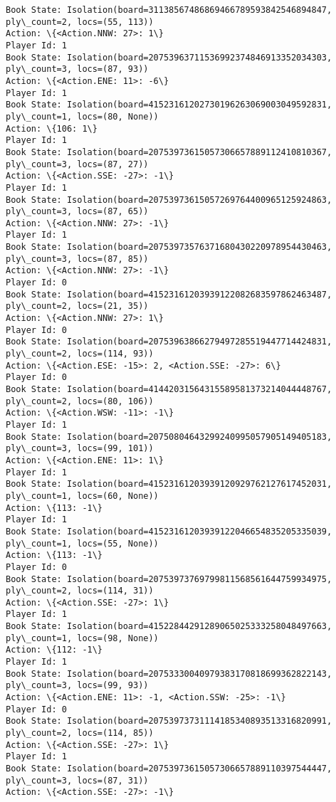 \documentclass[11pt]{article}
\begin{document}
\begin{Verbatim}[commandchars=\\\{\}]
Book State: Isolation(board=31138567486869466789593842546894847, ply\_count=2, locs=(55, 113))
Action: \{<Action.NNW: 27>: 1\}
Player Id: 1
Book State: Isolation(board=20753963711536992374846913352034303, ply\_count=3, locs=(87, 93))
Action: \{<Action.ENE: 11>: -6\}
Player Id: 1
Book State: Isolation(board=41523161202730196263069003049592831, ply\_count=1, locs=(80, None))
Action: \{106: 1\}
Player Id: 1
Book State: Isolation(board=20753973615057306657889112410810367, ply\_count=3, locs=(87, 27))
Action: \{<Action.SSE: -27>: -1\}
Player Id: 1
Book State: Isolation(board=20753973615057269764400965125924863, ply\_count=3, locs=(87, 65))
Action: \{<Action.NNW: 27>: -1\}
Player Id: 1
Book State: Isolation(board=20753973576371680430220978954430463, ply\_count=3, locs=(87, 85))
Action: \{<Action.NNW: 27>: -1\}
Player Id: 0
Book State: Isolation(board=41523161203939122082683597862463487, ply\_count=2, locs=(21, 35))
Action: \{<Action.NNW: 27>: 1\}
Player Id: 0
Book State: Isolation(board=20753963866279497285519447714424831, ply\_count=2, locs=(114, 93))
Action: \{<Action.ESE: -15>: 2, <Action.SSE: -27>: 6\}
Player Id: 0
Book State: Isolation(board=41442031564315589581373214044448767, ply\_count=2, locs=(80, 106))
Action: \{<Action.WSW: -11>: -1\}
Player Id: 1
Book State: Isolation(board=20750804643299240995057905149405183, ply\_count=3, locs=(99, 101))
Action: \{<Action.ENE: 11>: 1\}
Player Id: 1
Book State: Isolation(board=41523161203939120929762127617452031, ply\_count=1, locs=(60, None))
Action: \{113: -1\}
Player Id: 1
Book State: Isolation(board=41523161203939122046654835205335039, ply\_count=1, locs=(55, None))
Action: \{113: -1\}
Player Id: 0
Book State: Isolation(board=20753973769799811568561644759934975, ply\_count=2, locs=(114, 31))
Action: \{<Action.SSE: -27>: 1\}
Player Id: 1
Book State: Isolation(board=41522844291289065025333258048497663, ply\_count=1, locs=(98, None))
Action: \{112: -1\}
Player Id: 1
Book State: Isolation(board=20753330040979383170818699362822143, ply\_count=3, locs=(99, 93))
Action: \{<Action.ENE: 11>: -1, <Action.SSW: -25>: -1\}
Player Id: 0
Book State: Isolation(board=20753973731114185340893513316820991, ply\_count=2, locs=(114, 85))
Action: \{<Action.SSE: -27>: 1\}
Player Id: 1
Book State: Isolation(board=20753973615057306657889110397544447, ply\_count=3, locs=(87, 31))
Action: \{<Action.SSE: -27>: -1\}


\end{Verbatim}
\end{document}
